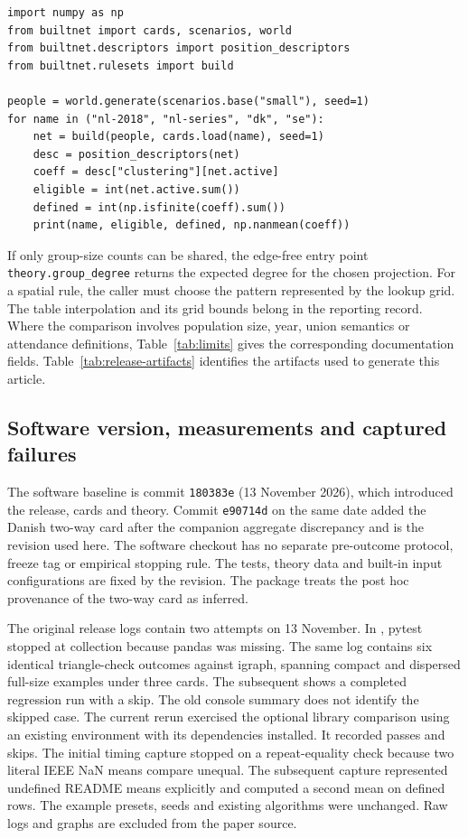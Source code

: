 \begin{lstlisting}
import numpy as np
from builtnet import cards, scenarios, world
from builtnet.descriptors import position_descriptors
from builtnet.rulesets import build

people = world.generate(scenarios.base("small"), seed=1)
for name in ("nl-2018", "nl-series", "dk", "se"):
    net = build(people, cards.load(name), seed=1)
    desc = position_descriptors(net)
    coeff = desc["clustering"][net.active]
    eligible = int(net.active.sum())
    defined = int(np.isfinite(coeff).sum())
    print(name, eligible, defined, np.nanmean(coeff))
\end{lstlisting}

If only group-size counts can be shared, the edge-free entry point \texttt{theory.group\_degree} returns the expected degree for the chosen projection. For a spatial rule, the caller must choose the pattern represented by the lookup grid. The table interpolation and its grid bounds belong in the reporting record. Where the comparison involves population size, year, union semantics or attendance definitions, Table~\ref{tab:limits} gives the corresponding documentation fields. Table~\ref{tab:release-artifacts} identifies the artifacts used to generate this article.



\subsection{Software version, measurements and captured failures}

The software baseline is commit \texttt{180383e} (13 November 2026), which introduced the release, cards and theory. Commit \texttt{e90714d} on the same date added the Danish two-way card after the companion aggregate discrepancy and is the revision used here. The software checkout has no separate pre-outcome protocol, freeze tag or empirical stopping rule. The tests, theory data and built-in input configurations are fixed by the revision. The package treats the post hoc provenance of the two-way card as inferred.

The original release logs contain two attempts on 13 November. In , pytest stopped at collection because pandas was missing. The same log contains six identical triangle-check outcomes against igraph, spanning compact and dispersed full-size examples under three cards. The subsequent  shows a completed regression run with a skip. The old console summary does not identify the skipped case. The current rerun exercised the optional library comparison using an existing environment with its dependencies installed. It recorded \TestCount{} passes and \SkippedTests{} skips. The initial timing capture stopped on a repeat-equality check because two literal IEEE NaN means compare unequal. The subsequent capture represented undefined README means explicitly and computed a second mean on defined rows. The example presets, seeds and existing algorithms were unchanged. Raw logs and graphs are excluded from the paper source.

